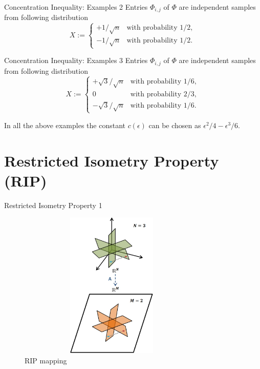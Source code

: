 \documentclass{beamer}
\begin{document}
\begin{frame}{Concentration Inequality: Examples 2}
Entries $\Phi_{i, j}$ of $\Phi$ are independent samples from following distribution 
    $$
    X :=\begin{cases}
         +1/\sqrt{n} & \text{with probability } 1/2, \\
         -1/\sqrt{n} & \text{with probability } 1/2.
    \end{cases}
    $$
    
\end{frame}

\begin{frame}{Concentration Inequality: Examples 3}
Entries $\Phi_{i, j}$ of $\Phi$ are independent samples from following distribution 
    $$
    X :=\begin{cases}
         +\sqrt{3}/\sqrt{n} & \text{with probability } 1/6, \\
         0 & \text{with probability } 2/3, \\
         -\sqrt{3}/\sqrt{n} & \text{with probability } 1/6.
    \end{cases}
    $$
    
    In all the above examples the constant $c(\epsilon)$ can be chosen as $\epsilon^2/4 - \epsilon^3/6$. \\
    
\end{frame}


\section{Restricted Isometry Property (RIP)}

\begin{frame}{Restricted Isometry Property 1}
    \begin{figure}
        \centering
        \includegraphics[width=9cm, height=7cm]{images/rip1.png}
        \caption{RIP mapping}
        \label{fig:rip1}
    \end{figure}
\end{frame}
\end{document}
